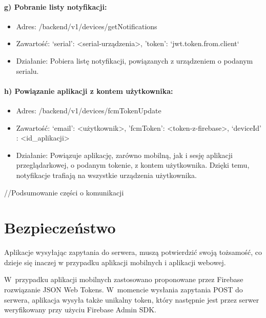 \paragraph{g) Pobranie listy notyfikacji:}
\begin{itemize}
\item Adres: /backend/v1/devices/getNotifications
\item Zawartość: {‘serial’: <serial-urządzenia>,  'token': `jwt.token.from.client`}
\item Działanie: Pobiera listę notyfikacji, powiązanych z urządzeniem o podanym serialu.
\end{itemize}
\paragraph{h) Powiązanie aplikacji z kontem użytkownika:}
\begin{itemize}
\item Adres: /backend/v1/devices/fcmTokenUpdate
\item Zawartość: {‘email’: <użytkownik>, 'fcmToken': <token-z-firebase>, ‘deviceId’ : <id_aplikacji>}
\item Działanie: Powiązuje aplikację, zarówno mobilną, jak i sesję aplikacji przeglądarkowej, o podanym tokenie, z kontem użytkownika. Dzięki temu, notyfikacje trafiają na wszystkie urządzenia użytkownika.
\end{itemize}

//Podsumowanie części o komunikacji

\section*{Bezpieczeństwo}

Aplikacje wysyłając zapytania do serwera, muszą potwierdzić swoją tożsamość, co dzieje się inaczej w przypadku aplikacji mobilnych i aplikacji webowej.

W~przypadku aplikacji mobilnych zastosowano proponowane przez Firebase rozwiązanie JSON Web Tokens. W~momencie wysłania zapytania POST do serwera, aplikacja wysyła także unikalny token, który następnie jest przez serwer weryfikowany przy użyciu Firebase Admin SDK.


